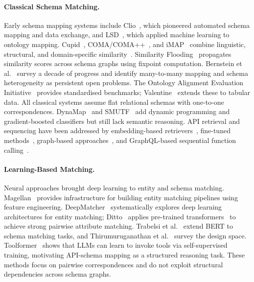 \documentclass[sigconf, nonacm]{acmart}
\begin{document}
\paragraph{Classical Schema Matching.} Early schema mapping systems include Clio~\cite{miller2001clio,fagin2009clio}, which pioneered automated schema mapping and data exchange, and LSD~\cite{doan2003learning}, which applied machine learning to ontology mapping. Cupid~\cite{madhavan2001generic}, COMA/COMA++~\cite{10.5555/1287369.1287422,ahn2005comapp}, and iMAP~\cite{dhamankar2004imap} combine linguistic, structural, and domain-specific similarity~\cite{rahm2001survey,euzenat2013ontology}. Similarity Flooding~\cite{melnik2002similarity} propagates similarity scores across schema graphs using fixpoint computation. Bernstein et al.~\cite{bernstein2011generic} survey a decade of progress and identify many-to-many mapping and schema heterogeneity as persistent open problems. The Ontology Alignment Evaluation Initiative~\cite{euzenat2011ontology} provides standardised benchmarks; Valentine~\cite{koutras2021valentine} extends these to tabular data. All classical systems assume flat relational schemas with one-to-one correspondences. DynaMap~\cite{mazilu2022schema} and SMUTF~\cite{zhang2025smutf} add dynamic programming and gradient-boosted classifiers but still lack semantic reasoning. API retrieval and sequencing have been addressed by embedding-based retrievers~\cite{li2023api,patil2023gorilla}, fine-tuned methods~\cite{toolllm}, graph-based approaches~\cite{mandal2024graph}, and GraphQL-based sequential function calling~\cite{saha-etal-2024-sequential}.

\paragraph{Learning-Based Matching.} Neural approaches brought deep learning to entity and schema matching. Magellan~\cite{konda2016magellan} provides infrastructure for building entity matching pipelines using feature engineering. DeepMatcher~\cite{mudgal2018deep} systematically explores deep learning architectures for entity matching; Ditto~\cite{li2020ditto} applies pre-trained transformers~\cite{vaswani2017attention,devlin2019bert} to achieve strong pairwise attribute matching. Trabelsi et al.~\cite{trabelsi2019schema} extend BERT to schema matching tasks, and Thirumuruganathan et al.~\cite{thirumuruganathan2020deep} survey the design space. Toolformer~\cite{schick2023toolformer} shows that LLMs can learn to invoke tools via self-supervised training, motivating API-schema mapping as a structured reasoning task. These methods focus on pairwise correspondences and do not exploit structural dependencies across schema graphs.
\end{document}
